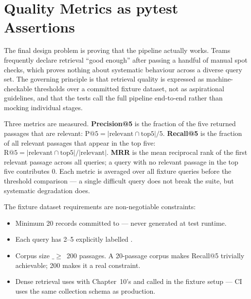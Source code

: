 \section{Quality Metrics as pytest Assertions}
\label{sec:metrics}

The final design problem is proving that the pipeline actually works. Teams
frequently declare retrieval ``good enough'' after passing a handful of manual
spot checks, which proves nothing about systematic behaviour across a
diverse query set. The governing principle is that retrieval quality is
expressed as machine-checkable thresholds over a committed fixture dataset,
not as aspirational guidelines, and that the tests call the full pipeline
end-to-end rather than mocking individual stages.

Three metrics are measured. \textbf{Precision@5} is the fraction of the
five returned passages that are relevant: $\text{P@5} = |\text{relevant}
\cap \text{top5}| / 5$. \textbf{Recall@5} is the fraction of all relevant
passages that appear in the top five: $\text{R@5} = |\text{relevant} \cap
\text{top5}| / |\text{relevant}|$. \textbf{MRR} is the mean reciprocal
rank of the first relevant passage across all queries; a query with no
relevant passage in the top five contributes 0. Each metric is averaged over
all fixture queries before the threshold comparison --- a single difficult
query does not break the suite, but systematic degradation does.

The fixture dataset requirements are non-negotiable constraints:

\begin{itemize}
  \item Minimum 20  records committed to
     --- never generated at test
    runtime.
  \item Each query has 2--5 explicitly labelled .
  \item Corpus size \(\_\geq\)\, 200 passages. A 20-passage corpus makes
    Recall@5 trivially achievable; 200 makes it a real constraint.
  \item Dense retrieval uses  with
    Chapter~10's  and
     called in the fixture setup --- CI
    uses the same collection schema as production.
\end{itemize}

